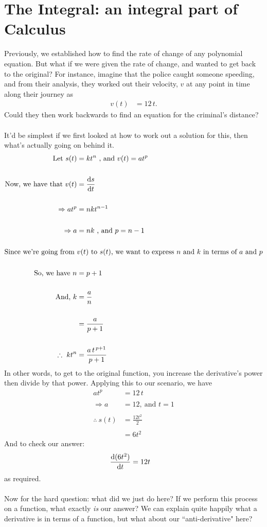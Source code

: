 \documentclass[11pt]{article}
\numberwithin{equation}{section}
\begin{document}
\section{The Integral: an integral part of Calculus}
Previously, we established how to find the rate of change of any polynomial equation. But what if we were given the rate of change, and wanted to get back to the original? For instance, imagine that the police caught someone speeding, and from their analysis, they worked out their velocity, \(v\) at any point in time along their journey as
\begin{align*}
	v(t) &= 12 \, t.
\end{align*} 
Could they then work backwards to find an equation for the criminal's distance?
\\ \\ It'd be simplest if we first looked at how to work out a solution for this, then what's actually going on behind it.
\begin{align*}
\textrm{Let } s(t) &= kt^n \ \textrm{, and } v(t) = at^p \\ \\
\textrm{Now, we have that } v(t) &= \frac{\textrm{d}s}{\textrm{d}t} \\ \\ 
\Rightarrow at^p &= nkt^{n-1} \\ \\
\Rightarrow a &= nk \ \textrm{, and } p = n - 1 \\ \\
\textrm{Since we're going from } & v(t) \textrm{ to } s(t) \textrm{, we want to express } n \textrm{ and } k \textrm{ in terms of } a \textrm{ and } p \\ \\
\textrm{So, we have } n &= p + 1 \\ \\
\textrm{And, } k &= \frac{a}{n} \\ \\
&= \frac{a}{p + 1} \\ \\
\therefore{} \ kt^n &= \frac{a \, t^{\, p+1}}{p + 1} 
\end{align*}
In other words, to get to the original function, you increase the derivative's power then divide by that power. Applying this to our scenario, we have
\begin{align*}
at^p &= 12 \, t \\ \\
\Rightarrow a &= 12, \ \textrm{and } t = 1 \\ \\
\therefore{} \ s(t) &= \frac{12 t^2}{2} \\ \\
&= 6t^2
\end{align*}
And to check our answer:
\begin{align*}
\frac{\textrm{d}(6t^2)}{\textrm{d}t} &= 12t 
\end{align*}
as required.
\\ \\ Now for the hard question: what did we just do here? If we perform this process on a function, what exactly \textit{is} our answer? We can explain quite happily what a derivative is in terms of a function, but what about our ``anti-derivative" here?
\end{document}
